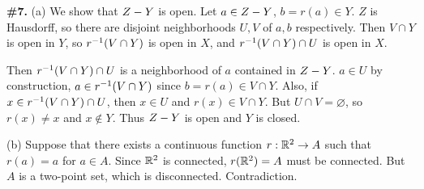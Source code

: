 \documentclass[a4paper,11pt]{article}
\begin{document}
\newpage

\phantom{?}
\vspace{5mm}

\begin{minipage}[t][270mm]{90mm}
    {\bfseries \large \#7.} (a) We show that \(Z - Y\) is open. Let \(a \in Z - Y\), \(b = r(a) \in Y\). \(Z\) is Hausdorff, so there are disjoint neighborhoods \(U, V\) of \(a, b\) respectively. Then \(V \cap Y\) is open in \(Y\), so \(r^{-1}(V\cap Y)\) is open in \(X\), and \(r^{-1}(V\cap Y) \cap U\) is open in \(X\).

    Then \(r^{-1}(V\cap Y) \cap U\) is a neighborhood of \(a\) contained in \(Z - Y\). \(a \in U\) by construction, \(a \in r^{-1}(V\cap Y)\) since \(b = r(a) \in V \cap Y\). Also, if \(x \in r^{-1}(V\cap Y) \cap U\), then \(x \in U\) and \(r(x) \in V \cap Y\). But \(U \cap V = \varnothing\), so \(r(x) \neq x\) and \(x \notin Y\). Thus \(Z - Y\) is open and \(Y\) is closed.

    (b) Suppose that there exists a continuous function \(r : \mathbb{R}^2 \rightarrow A\) such that \(r(a) = a\) for \(a \in A\). Since \(\mathbb{R}^2\) is connected, \(r(\mathbb{R}^2) = A\) must be connected. But \(A\) is a two-point set, which is disconnected. Contradiction.
\end{minipage}
{\color{gray}\vline}
\begin{minipage}[t][270mm]{90mm}
    \phantom{?}
\end{minipage}

\newpage

\phantom{?}
\vspace{5mm}
\end{document}
